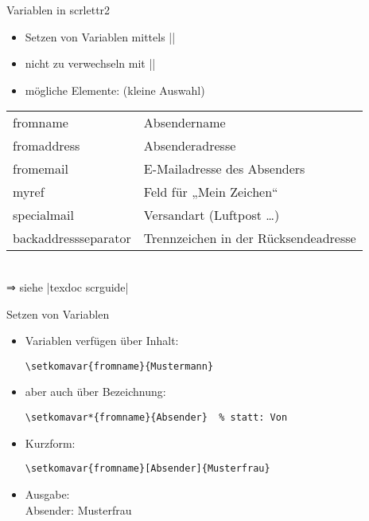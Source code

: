 \documentclass{beamer}
\newcommand{\meta}[1]{\textcolor{gray}{$\langle$\texttt{\textsl{#1}}$\rangle$}}
\begin{document}
\begin{frame}[fragile]{Variablen in scrlettr2}
    \begin{itemize}
		\item Setzen von Variablen mittels |\setkomavar{|\meta{Variable}|}{|\meta{Wert}|}|
		\item \alert{nicht zu verwechseln} mit |\KOMAoptions{}|
		\item mögliche Elemente: (kleine Auswahl)
	\end{itemize}

\begin{tabular}{>{\ttfamily}ll}\toprule
fromname & Absendername\\
fromaddress & Absenderadresse\\
fromemail & E-Mailadresse des Absenders\\\pause
myref & Feld für „Mein Zeichen“\\
specialmail & Versandart (Luftpost …)\\
backaddressseparator & Trennzeichen in der Rücksendeadresse\\\bottomrule
\end{tabular}\\[2ex]
⇒ siehe |texdoc scrguide|
\end{frame}

\begin{frame}[fragile]{Setzen von Variablen}
    \begin{itemize}
		\item Variablen verfügen über \alert{Inhalt}:\\%
\begin{lstlisting}
\setkomavar{fromname}{Mustermann}
\end{lstlisting}
		\item aber auch über \alert{Bezeichnung}:\\%
\begin{lstlisting}
\setkomavar*{fromname}{Absender}  % statt: Von
\end{lstlisting}
		\item Kurzform:\\%
\begin{lstlisting}
\setkomavar{fromname}[Absender]{Musterfrau}
\end{lstlisting}
		\item Ausgabe:\\%
Absender: Musterfrau
	\end{itemize}
\end{frame}
\end{document}
